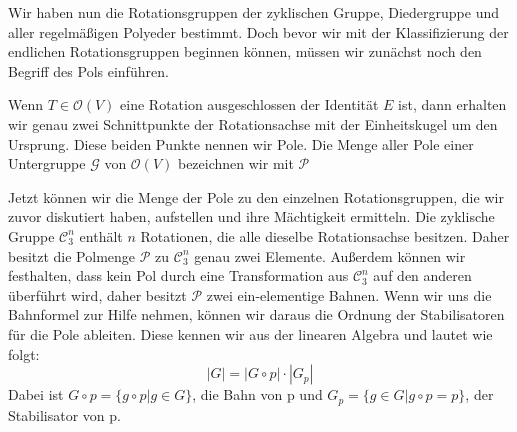 Wir haben nun die Rotationsgruppen der zyklischen Gruppe, Diedergruppe und aller regelmäßigen Polyeder bestimmt. Doch bevor wir mit der Klassifizierung der endlichen Rotationsgruppen beginnen können, müssen wir zunächst noch den Begriff des Pols einführen.

\begin{defi}[Pole]
	Wenn $T \in \mathcal{O}(V)$ eine Rotation ausgeschlossen der Identität $E$ ist, dann erhalten wir genau zwei Schnittpunkte der Rotationsachse mit der Einheitskugel um den Ursprung. Diese beiden Punkte nennen wir Pole. Die Menge aller Pole einer Untergruppe $\mathcal{G}$ von $\mathcal{O}(V)$ bezeichnen wir mit $\mathcal{P}$
\end{defi} 

Jetzt können wir die Menge der Pole zu den einzelnen Rotationsgruppen, die wir zuvor diskutiert haben, aufstellen und ihre Mächtigkeit ermitteln. Die zyklische Gruppe $\mathcal{C}^n_3$ enthält $n$ Rotationen, die alle dieselbe Rotationsachse besitzen. Daher besitzt die Polmenge $\mathcal{P}$ zu $\mathcal{C}^n_3$ genau zwei Elemente. Außerdem können wir festhalten, dass kein Pol durch eine Transformation aus $\mathcal{C}^n_3$ auf den anderen überführt wird, daher besitzt $\mathcal{P}$ zwei ein-elementige Bahnen. Wenn wir uns die Bahnformel zur Hilfe nehmen, können wir daraus die Ordnung der Stabilisatoren für die Pole ableiten. Diese kennen wir aus der linearen Algebra und lautet wie folgt:
$$ |G| = |G \circ p| \cdot |G_p| $$
Dabei ist $G \circ p = \{g \circ p | g \in G\}$, die Bahn von p und $G_p = \{g \in G | g \circ p = p \}$, der Stabilisator von p. 

